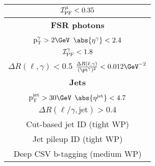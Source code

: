 \begin{table}[H]
\begin{tabular}{|c|c|}
                		\multicolumn{2}{|c|}{$\ensuremath{{\cal I}_{\mathrm{PF}}^{\mu}} < 0.35$}                                                                                                                                           \\ \hline \hline
		\multicolumn{2}{|c|}{\textbf{FSR photons}}                                                                                                                                                                                  \\ \hline
		\multicolumn{2}{|c|}{$\mathrm{p_T^{\gamma}} > 2 \GeV$ \hspace{0.5cm} $\abs{\eta^{\gamma}} < 2.4$}                                                                                                                                 \\
		\multicolumn{2}{|c|}{$\ensuremath{{\cal I}_{\mathrm{PF}}^{\gamma}} < 1.8$}                                                                                                                                         \\
		\multicolumn{2}{|c|}{$\Delta R(\ell,\gamma) < 0.5$ \hspace{0.5cm} $\frac{\Delta R(\ell,\gamma)}{(\pt^{\gamma})^2} < 0.012 \GeV^{-2}$}                                                                                             \\ \hline \hline
		\multicolumn{2}{|c|}{\textbf{Jets}}                                                                                                                                                                                         \\ \hline
		\multicolumn{2}{|c|}{$\mathrm{p_T^{\mathrm{jet}}} > 30 \GeV$ \hspace{0.5cm} $\abs{\eta^{\mathrm{jet}}} < 4.7$}                                                                                                                    \\
		\multicolumn{2}{|c|}{$\Delta R(\ell/\gamma, \mathrm{jet}) > 0.4$} \\
                \multicolumn{2}{|c|}{Cut-based jet ID (tight WP) } \\
                \multicolumn{2}{|c|}{Jet pileup ID (tight WP)} \\
                \multicolumn{2}{|c|}{Deep CSV b-tagging (medium WP)} \\

\end{tabular}
\end{table}

